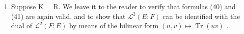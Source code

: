 \begin{enumerate}
\def\labelenumi{\arabic{enumi})}
\setcounter{enumi}{1}
\tightlist
\item
  Suppose K = R. We leave it to the reader to verify that formulas (40) and (41) are again valid, and to show that \(\mathcal{L}^{2}(E; F)\) can be identified with the dual of \(\mathcal{L}^{2}(F; E)\) by means of the bilinear form \((u, v) \mapsto \operatorname{Tr}(uv)\) .
\end{enumerate}

